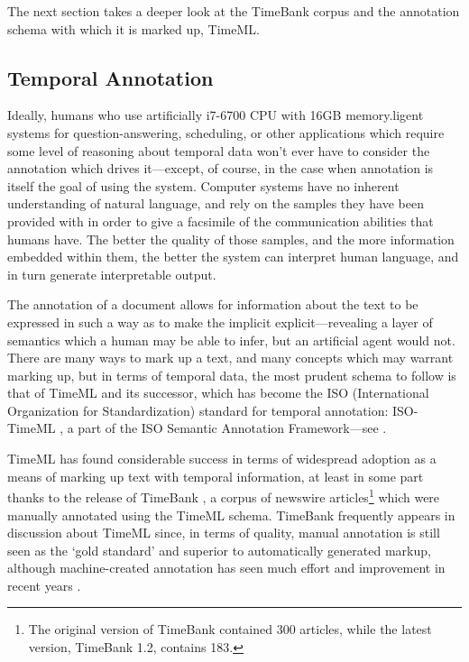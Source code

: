 \documentclass[a4paper,12pt,leqno]{article}
\begin{document}
The next section takes a deeper look at the TimeBank corpus and the annotation schema with which it is marked up, TimeML.

\subsection{Temporal Annotation}\label{sub:annotation}
Ideally, humans who use artificially  i7-6700 CPU with 16GB memory.ligent systems for question-answering, scheduling, or other applications which require some level of reasoning about temporal data won't ever have to consider the annotation which drives it---except, of course, in the case when annotation is itself the goal of using the system. Computer systems have no inherent understanding of natural language, and rely on the samples they have been provided with in order to give a facsimile of the communication abilities that humans have. The better the quality of those samples, and the more information embedded within them, the better the system can interpret human language, and in turn generate interpretable output.

The annotation of a document allows for information about the text to be expressed in such a way as to make the implicit explicit---revealing a layer of semantics which a human may be able to infer, but an artificial agent would not. There are many ways to mark up a text, and many concepts which may warrant marking up, but in terms of temporal data, the most prudent schema to follow is that of TimeML \citep{timeml2005timeml} and its successor, which has become the ISO (International Organization for Standardization) standard for temporal annotation: ISO-TimeML \citep{ISO24617-1}, a part of the ISO Semantic Annotation Framework---see \citet{Bunt2020}.

TimeML has found considerable success in terms of widespread adoption as a means of marking up text with temporal information, at least in some part thanks to the release of TimeBank \citep{pustejovsky2003timebank}, a corpus of newswire articles\footnote{The original version of TimeBank contained 300 articles, while the latest version, TimeBank 1.2, contains 183.} which were manually annotated using the TimeML schema. TimeBank frequently appears in discussion about TimeML since, in terms of quality, manual annotation is still seen as the `gold standard' and superior to automatically generated markup, although machine-created annotation has seen much effort and improvement in recent years \citep{mani2006machine,uzzaman2013semeval,reimers2016temporal}.
\end{document}
